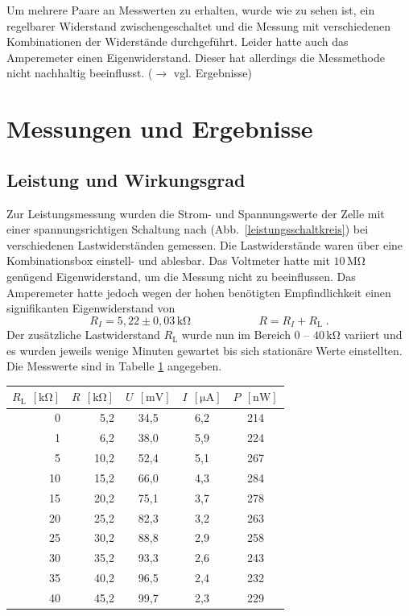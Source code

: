 \documentclass[11pt]{scrartcl}
\newcommand{\unit}[1]{\ensuremath{\,\mathrm{#1}}} %
\begin{document}
Um mehrere Paare an Messwerten zu erhalten, wurde wie zu sehen ist, ein regelbarer Widerstand zwischengeschaltet und die Messung mit verschiedenen Kombinationen der Widerst\"ande durchgef\"uhrt. Leider hatte auch das Amperemeter einen Eigenwiderstand. Dieser hat allerdings die Messmethode nicht nachhaltig beeinflusst. ($\rightarrow$ vgl. Ergebnisse) %





\section{Messungen und Ergebnisse}
\subsection{Leistung und Wirkungsgrad}
Zur Leistungsmessung wurden die Strom- und Spannungswerte der Zelle mit einer spannungsrichtigen Schaltung nach (Abb.~\ref{leistungsschaltkreis}) bei verschiedenen Lastwiderständen gemessen. Die Lastwiderstände waren über eine Kombinationsbox einstell- und ablesbar. Das Voltmeter hatte mit $10\unit{M\Omega}$ genügend Eigenwiderstand, um die Messung nicht zu beeinflussen. Das Amperemeter hatte jedoch wegen der hohen benötigten Empfindlichkeit einen signifikanten Eigenwiderstand von
\[
R_I = 5,22\pm 0,03 \unit{k\Omega}
\qquad\qquad\qquad
R = R_I+R_{\text{L}}\;.
\]
Der zusätzliche Lastwiderstand $R_{\text{L}}$ wurde nun im Bereich 0 -- $40\unit{k\Omega}$ variiert und es wurden jeweils wenige Minuten gewartet bis sich stationäre Werte einstellten. Die Messwerte sind in Tabelle \ref{leistungsmesstabelle} angegeben.
\begin{table}[ht]
\label{leistungsmesstabelle}
\begin{center}\vspace{-\baselineskip}
\begin{tabular}{rr|ccc}
$R_{\text{L}}\; \unit{[k\Omega]}$ &
$R\; \unit{[k\Omega]}$ &
$U\; \unit{[mV]}$ &
$I\; \unit{[\mu A]}$ &
$P\; \unit{[nW]}$ \\
\hline
0	& 5,2	& 34,5	& 6,2	& 214 \\
1	& 6,2	& 38,0	& 5,9	& 224 \\
5	& 10,2	& 52,4	& 5,1	& 267 \\
10	& 15,2	& 66,0	& 4,3	& 284 \\
15	& 20,2	& 75,1	& 3,7	& 278 \\
20	& 25,2	& 82,3	& 3,2	& 263 \\
25	& 30,2	& 88,8	& 2,9	& 258 \\
30	& 35,2	& 93,3	& 2,6	& 243 \\
35	& 40,2	& 96,5	& 2,4	& 232 \\
40	& 45,2	& 99,7	& 2,3	& 229
\end{tabular}
\vspace{-\baselineskip}\end{center}
\end{table}
\end{document}
